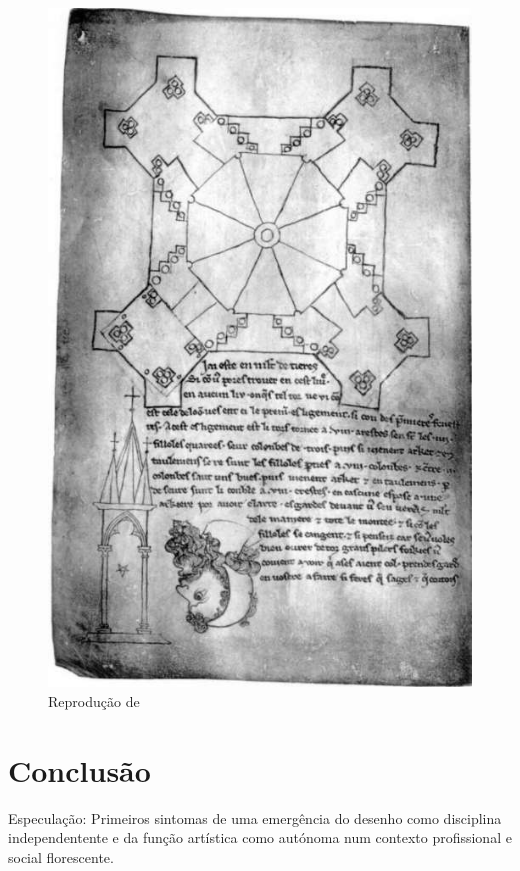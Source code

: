 \documentclass{article}
\begin{document}
\begin{figure}
\centering\includegraphics[height=0.6\textheight,keepaspectratio]{images/villard-barbicha.jpg}
  \caption{Reprodução de \citeauthor{villard-coiso-1}}
  \label{fig:villard-coiso-1}
\end{figure}

\section{Conclusão}

Especulação: Primeiros sintomas de uma emergência do desenho como
disciplina independentente e da função artística como autónoma num
contexto profissional e social florescente.

\printbibliography[heading=bibliography,title={Bibliografia},type=book]
\printbibliography[heading=subbibliography,title={Reproduções},type=artwork]
\end{document}
